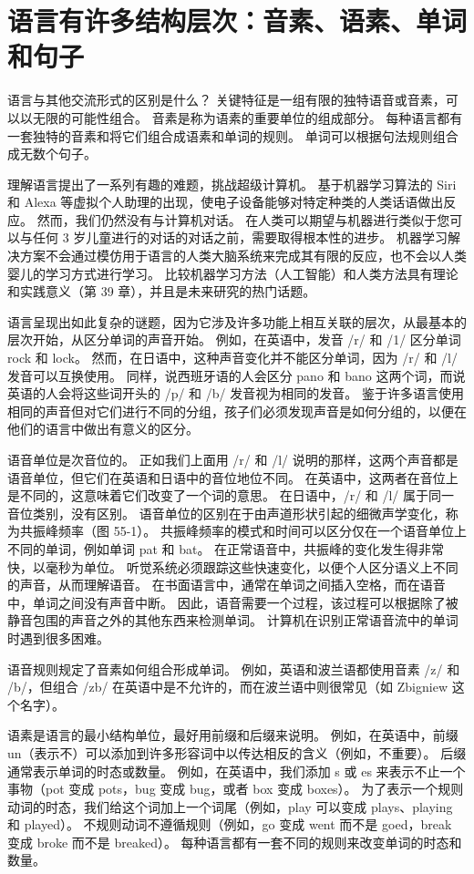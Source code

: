 \section{语言有许多结构层次：音素、语素、单词和句子}
语言与其他交流形式的区别是什么？ 关键特征是一组有限的独特语音或音素，可以以无限的可能性组合。 音素是称为语素的重要单位的组成部分。 每种语言都有一套独特的音素和将它们组合成语素和单词的规则。 单词可以根据句法规则组合成无数个句子。

理解语言提出了一系列有趣的难题，挑战超级计算机。 基于机器学习算法的 Siri 和 Alexa 等虚拟个人助理的出现，使电子设备能够对特定种类的人类话语做出反应。 然而，我们仍然没有与计算机对话。 在人类可以期望与机器进行类似于您可以与任何 3 岁儿童进行的对话的对话之前，需要取得根本性的进步。 机器学习解决方案不会通过模仿用于语言的人类大脑系统来完成其有限的反应，也不会以人类婴儿的学习方式进行学习。 比较机器学习方法（人工智能）和人类方法具有理论和实践意义（第 39 章），并且是未来研究的热门话题。

语言呈现出如此复杂的谜题，因为它涉及许多功能上相互关联的层次，从最基本的层次开始，从区分单词的声音开始。 例如，在英语中，发音 /r/ 和 /1/ 区分单词 rock 和 lock。 然而，在日语中，这种声音变化并不能区分单词，因为 /r/ 和 /l/ 发音可以互换使用。 同样，说西班牙语的人会区分 pano 和 bano 这两个词，而说英语的人会将这些词开头的 /p/ 和 /b/ 发音视为相同的发音。 鉴于许多语言使用相同的声音但对它们进行不同的分组，孩子们必须发现声音是如何分组的，以便在他们的语言中做出有意义的区分。

语音单位是次音位的。 正如我们上面用 /r/ 和 /l/ 说明的那样，这两个声音都是语音单位，但它们在英语和日语中的音位地位不同。 在英语中，这两者在音位上是不同的，这意味着它们改变了一个词的意思。 在日语中，/r/ 和 /l/ 属于同一音位类别，没有区别。 语音单位的区别在于由声道形状引起的细微声学变化，称为共振峰频率（图 55-1）。 共振峰频率的模式和时间可以区分仅在一个语音单位上不同的单词，例如单词 pat 和 bat。 在正常语音中，共振峰的变化发生得非常快，以毫秒为单位。 听觉系统必须跟踪这些快速变化，以便个人区分语义上不同的声音，从而理解语音。 在书面语言中，通常在单词之间插入空格，而在语音中，单词之间没有声音中断。 因此，语音需要一个过程，该过程可以根据除了被静音包围的声音之外的其他东西来检测单词。 计算机在识别正常语音流中的单词时遇到很多困难。

语音规则规定了音素如何组合形成单词。 例如，英语和波兰语都使用音素 /z/ 和 /b/，但组合 /zb/ 在英语中是不允许的，而在波兰语中则很常见（如 Zbigniew 这个名字）。

语素是语言的最小结构单位，最好用前缀和后缀来说明。 例如，在英语中，前缀 un（表示不）可以添加到许多形容词中以传达相反的含义（例如，不重要）。 后缀通常表示单词的时态或数量。 例如，在英语中，我们添加 s 或 es 来表示不止一个事物（pot 变成 pots，bug 变成 bug，或者 box 变成 boxes）。 为了表示一个规则动词的时态，我们给这个词加上一个词尾（例如，play 可以变成 plays、playing 和 played）。 不规则动词不遵循规则（例如，go 变成 went 而不是 goed，break 变成 broke 而不是 breaked）。 每种语言都有一套不同的规则来改变单词的时态和数量。

